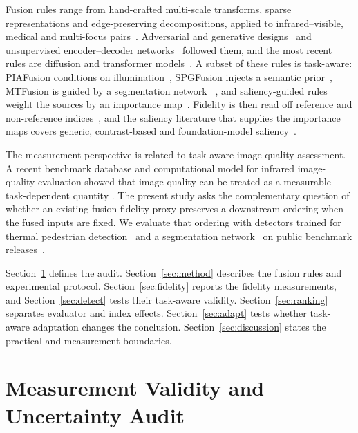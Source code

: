 \documentclass[journal]{IEEEtran}
\begin{document}
Fusion rules range from hand-crafted multi-scale transforms, sparse representations and
edge-preserving decompositions, applied to infrared--visible, medical and multi-focus
pairs~\cite{zhu2017,zhang2021,yin2013,nejati2015,yin2015,wang2014,zhang2016,wei2017,fu2009,ma2021,chen2007,piella}.
Adversarial and generative designs~\cite{ma20191,hou2021,yi2021,song2022} and
unsupervised encoder--decoder networks~\cite{xu2022,li2021,li2019,zhang2020,wang2024,liu2023,hao2022,yang2023,an2024}
followed them, and the most recent rules are diffusion and transformer
models~\cite{yi2024,yang2025}. A subset of these
rules is task-aware: PIAFusion conditions on illumination~\cite{tang2022}, SPGFusion
injects a semantic prior~\cite{zhang2026}, MTFusion is guided by a segmentation network
~\cite{zhou2026}, and saliency-guided rules weight the sources by an importance
map~\cite{bianco2020,khan2025,wang2025,xu2021}. Fidelity is then read off reference and
non-reference indices~\cite{sheikh2006,ma2019}, and the saliency literature that
supplies the importance maps covers generic, contrast-based and foundation-model
saliency~\cite{qin2020,zhu2025,kirillov2023sam,bianco2020,guo2024,petilli2022,li2010}.

The measurement perspective is related to task-aware image-quality assessment. A recent
benchmark database and computational model for infrared image-quality evaluation showed
that image quality can be treated as a measurable task-dependent quantity
\cite{goyal2025tim}. The present study asks the complementary question of whether an
existing fusion-fidelity proxy preserves a downstream ordering when the fused inputs
are fixed. We evaluate that ordering with detectors trained for thermal pedestrian
detection~\cite{redmon2016yolo,jocher2024yolo,lv2024rtdetr} and a segmentation
network~\cite{ronneberger2015} on public benchmark releases~\cite{flir_adas}.

Section~\ref{sec:validity} defines the audit. Section~\ref{sec:method} describes the
fusion rules and experimental protocol. Section~\ref{sec:fidelity} reports the
fidelity measurements, and Section~\ref{sec:detect} tests their task-aware validity.
Section~\ref{sec:ranking} separates evaluator and index effects.
Section~\ref{sec:adapt} tests whether task-aware adaptation changes the conclusion.
Section~\ref{sec:discussion} states the practical and measurement boundaries.

\section{Measurement Validity and Uncertainty Audit}
\label{sec:validity}
\end{document}
